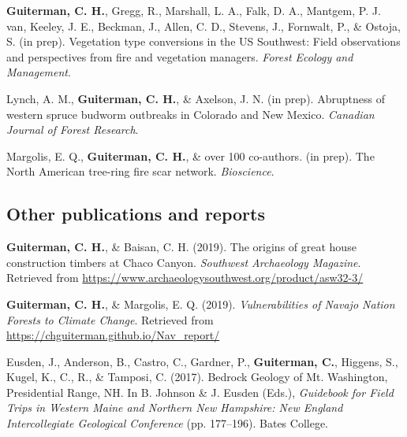 \documentclass[11pt,a4paper,]{moderncv}
\begin{document}
\leavevmode\hypertarget{ref-GuitermanFEM}{}%
\textbf{Guiterman, C. H.}, Gregg, R., Marshall, L. A., Falk, D. A.,
Mantgem, P. J. van, Keeley, J. E., Beckman, J., Allen, C. D., Stevens,
J., Fornwalt, P., \& Ostoja, S. (in prep). Vegetation type conversions
in the US Southwest: Field observations and perspectives from fire and
vegetation managers. \emph{Forest Ecology and Management}.

\leavevmode\hypertarget{ref-LynchWSBW}{}%
Lynch, A. M., \textbf{Guiterman, C. H.}, \& Axelson, J. N. (in prep).
Abruptness of western spruce budworm outbreaks in Colorado and New
Mexico. \emph{Canadian Journal of Forest Research}.

\leavevmode\hypertarget{ref-MargolisNAFSS}{}%
Margolis, E. Q., \textbf{Guiterman, C. H.}, \& over 100 co-authors. (in
prep). The North American tree-ring fire scar network.
\emph{Bioscience}.

\endgroup

\vspace{12pt}

\hypertarget{other-publications-and-reports}{%
\subsection{Other publications and
reports}\label{other-publications-and-reports}}

\begingroup
\setlength{\parindent}{-0.5in}
\setlength{\leftskip}{1.0in}
\setlength{\parskip}{8pt}

\hypertarget{refs_reports}{}
\leavevmode\hypertarget{ref-ChacoSWMag}{}%
\textbf{Guiterman, C. H.}, \& Baisan, C. H. (2019). The origins of great
house construction timbers at Chaco Canyon. \emph{Southwest Archaeology
Magazine}. Retrieved from
\url{https://www.archaeologysouthwest.org/product/asw32-3/}

\leavevmode\hypertarget{ref-NavajoVulnerabilities}{}%
\textbf{Guiterman, C. H.}, \& Margolis, E. Q. (2019).
\emph{Vulnerabilities of Navajo Nation Forests to Climate Change}.
Retrieved from \url{https://chguiterman.github.io/Nav_report/}

\leavevmode\hypertarget{ref-Eusden}{}%
Eusden, J., Anderson, B., Castro, C., Gardner, P., \textbf{Guiterman,
C.}, Higgens, S., Kugel, K., C., R., \& Tamposi, C. (2017). Bedrock
Geology of Mt. Washington, Presidential Range, NH. In B. Johnson \& J.
Eusden (Eds.), \emph{Guidebook for Field Trips in Western Maine and
Northern New Hampshire: New England Intercollegiate Geological
Conference} (pp. 177--196). Bates College.
\end{document}
